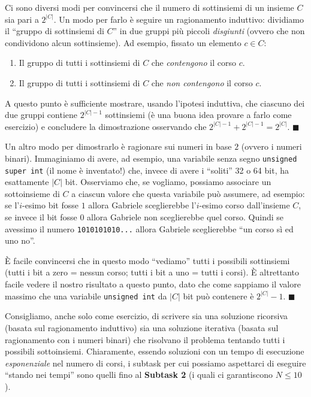 \begin{warning}
Ci sono diversi modi per convincersi che il numero di sottinsiemi di un insieme $C$ sia pari a $2^{|C|}$. Un modo per farlo è seguire un ragionamento induttivo: dividiamo il ``gruppo di sottinsiemi di $C$'' in due gruppi più piccoli \emph{disgiunti} (ovvero che non condividono alcun sottinsieme). Ad esempio, fissato un elemento $c \in C$:
\begin{enumerate}
\item Il gruppo di tutti i sottinsiemi di $C$ che \emph{contengono} il corso $c$.
\item Il gruppo di tutti i sottinsiemi di $C$ che \emph{non contengono} il corso $c$.
\end{enumerate}

A questo punto è sufficiente mostrare, usando l'ipotesi induttiva, che ciascuno dei due gruppi contiene $2^{|C|-1}$ sottinsiemi (è una buona idea provare a farlo come esercizio) e concludere la dimostrazione osservando che $2^{|C|-1}+2^{|C|-1}=2^{|C|}$. $\blacksquare$

Un altro modo per dimostrarlo è ragionare sui numeri in base $2$ (ovvero i numeri binari). Immaginiamo di avere, ad esempio, una variabile senza segno \texttt{unsigned super int} (il nome è inventato!) che, invece di avere i ``soliti'' 32 o 64 bit, ha esattamente $|C|$ bit. Osserviamo che, se vogliamo, possiamo associare un sottoinsieme di $C$ a ciascun valore che questa variabile può assumere, ad esempio: se l'$i$-esimo bit fosse $1$ allora Gabriele sceglierebbe l'$i$-esimo corso dall'insieme $C$, se invece il bit fosse $0$ allora Gabriele non sceglierebbe quel corso. Quindi se avessimo il numero \texttt{1010101010...} allora Gabriele sceglierebbe ``un corso sì ed uno no''.

È facile convincersi che in questo modo ``vediamo'' tutti i possibili sottinsiemi (tutti i bit a zero = nessun corso; tutti i bit a uno = tutti i corsi). È altrettanto facile vedere il nostro risultato a questo punto, dato che come sappiamo il valore massimo che una variabile \texttt{unsigned int} da $|C|$ bit può contenere è $2^{|C|}-1$. $\blacksquare$
\end{warning}

Consigliamo, anche solo come esercizio, di scrivere sia una soluzione ricorsiva (basata sul ragionamento induttivo) sia una soluzione iterativa (basata sul ragionamento con i numeri binari) che risolvano il problema tentando tutti i possibili sottoinsiemi. Chiaramente, essendo soluzioni con un tempo di esecuzione \textit{esponenziale} nel numero di corsi, i subtask per cui possiamo aspettarci di eseguire ``stando nei tempi'' sono quelli fino al \textbf{Subtask 2} (i quali ci garantiscono $N \le 10$).

